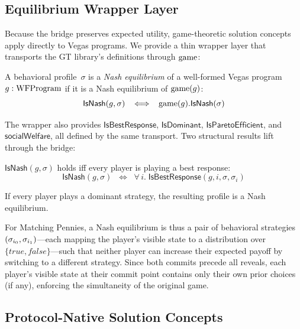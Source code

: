 \documentclass[11pt]{article}
\begin{document}
\subsection{Equilibrium Wrapper Layer}

Because the bridge preserves expected utility, game-theoretic solution concepts
apply directly to Vegas programs. We provide a thin wrapper layer that
transports the GT library's definitions through $\mathrm{game}$:

\begin{definition}
A behavioral profile~$\sigma$ is a \emph{Nash equilibrium} of a well-formed
Vegas program $g : \mathrm{WFProgram}$ if it is a Nash equilibrium of $\mathrm{game}(g)$:
\[
  \mathsf{IsNash}(g, \sigma) \;\;\iff\;\;
  \mathrm{game}(g).\mathsf{IsNash}(\sigma)
\]
\end{definition}

\noindent
The wrapper also provides $\mathsf{IsBestResponse}$, $\mathsf{IsDominant}$,
$\mathsf{IsParetoEfficient}$, and $\mathsf{socialWelfare}$, all defined by
the same transport. Two structural results lift through the bridge:

\begin{theorem}\label{thm:nashchar}
$\mathsf{IsNash}(g, \sigma)$ holds iff every player is playing a best
response:
\[
  \mathsf{IsNash}(g, \sigma) \;\;\iff\;\;
  \forall\, i.\; \mathsf{IsBestResponse}(g, i, \sigma, \sigma_i)
\]
\end{theorem}

\begin{theorem}\label{thm:domNash}
If every player plays a dominant strategy, the resulting profile is a Nash
equilibrium.

\noindent{}
\end{theorem}

\noindent
For Matching Pennies, a Nash equilibrium is thus a pair of behavioral
strategies $(\sigma_{i_{0}}, \sigma_{i_{1}})$---each mapping the player's
visible state to a distribution over $\{\mathit{true}, \mathit{false}\}$---such
that neither player can increase their expected payoff by switching to a
different strategy. Since both commits precede all reveals, each player's
visible state at their commit point contains only their own prior
choices (if any), enforcing the simultaneity of the original game.

\subsection{Protocol-Native Solution Concepts}\label{sec:protocolsem}
\end{document}
